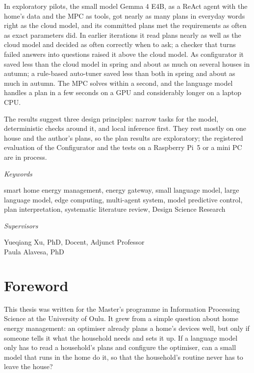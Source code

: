 \documentclass[12pt,a4paper]{report}
\newcommand{\unnumberedchapter}[1]{%
  \chapter*{#1}%
  \addcontentsline{toc}{chapter}{#1}%
}
\begin{document}
In exploratory pilots, the small model Gemma 4 E4B, as a ReAct agent
with the home's data and the MPC as tools, got nearly as many plans in
everyday words right as the cloud model, and its committed plans met
the requirements as often as exact parameters did. In earlier
iterations it read plans nearly as well as the cloud model and decided
as often correctly when to ask; a checker that turns failed answers
into questions raised it above the cloud model. As
configurator it saved less than the cloud model in spring and about as
much on several houses in autumn; a rule-based auto-tuner saved less than
both in spring and about as much in autumn. The MPC
solves within a second, and the language model handles a plan in a few
seconds on a GPU and considerably longer on a laptop CPU.

The results suggest three design principles: narrow tasks for the
model, deterministic checks around it, and local inference first. They
rest mostly on one house and the author's plans, so the plan results are
exploratory; the registered evaluation of the Configurator and the
tests on a Raspberry Pi~5 or a mini PC are in process.

\clearpage
{\sffamily\itshape Keywords}

\vspace{4pt}
smart home energy management, energy gateway, small language model, large
language model, edge computing, multi-agent system, model predictive
control, plan interpretation, systematic literature review, Design
Science Research

\vspace{12pt}
{\sffamily\itshape Supervisors}

\vspace{4pt}
Yueqiang Xu, PhD, Docent, Adjunct Professor\\
Paula Alavesa, PhD

\unnumberedchapter{Foreword}

This thesis was written for the Master's programme in Information
Processing Science at the University of Oulu. It grew from a simple
question about home energy management: an optimiser already plans a
home's devices well, but only if someone tells it what the household
needs and sets it up. If a language model only has to read a
household's plans and configure the optimiser, can a small model that
runs in the home do it, so that the household's routine never has to
leave the house?
\end{document}

